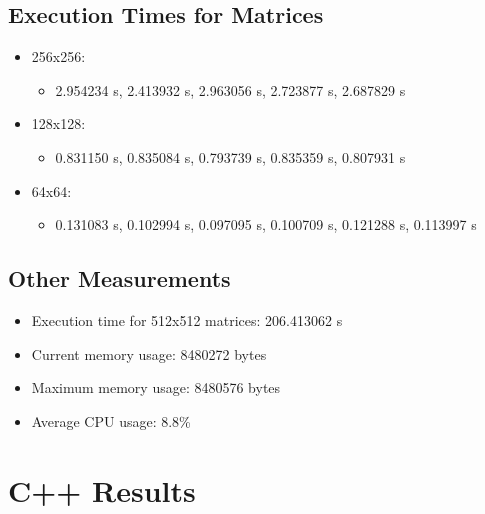 \documentclass{article}
\begin{document}
\subsection{Execution Times for Matrices}
\begin{itemize}
    \item 256x256: 
        \begin{itemize}
            \item 2.954234 s, 2.413932 s, 2.963056 s, 2.723877 s, 2.687829 s
        \end{itemize}
    \item 128x128: 
        \begin{itemize}
            \item 0.831150 s, 0.835084 s, 0.793739 s, 0.835359 s, 0.807931 s
        \end{itemize}
    \item 64x64: 
        \begin{itemize}
            \item 0.131083 s, 0.102994 s, 0.097095 s, 0.100709 s, 0.121288 s, 0.113997 s
        \end{itemize}
\end{itemize}

\subsection{Other Measurements}
\begin{itemize}
    \item Execution time for 512x512 matrices: 206.413062 s
    \item Current memory usage: 8480272 bytes
    \item Maximum memory usage: 8480576 bytes
    \item Average CPU usage: 8.8\%
\end{itemize}

\section{C++ Results}
\end{document}
